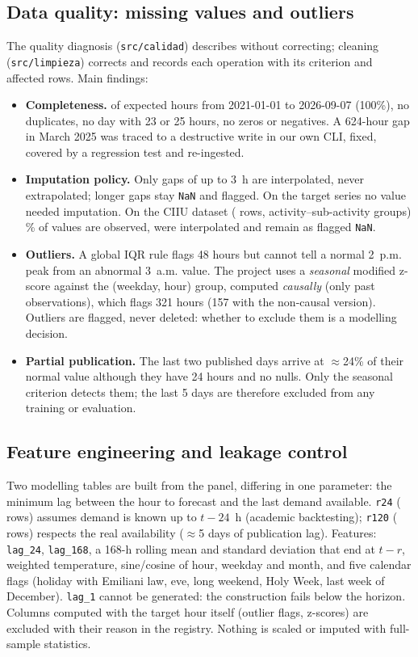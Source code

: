 \documentclass[conference,10pt]{IEEEtran}
\begin{document}
\subsection{Data quality: missing values and outliers}
The quality diagnosis (\texttt{src/calidad}) describes without correcting; cleaning (\texttt{src/limpieza}) corrects and records each operation with its criterion and affected rows. Main findings:
\begin{itemize}
\item \textbf{Completeness.} \panelFilas{} of \panelFilas{} expected hours from 2021-01-01 to 2026-09-07 (100\%), no duplicates, no day with 23 or 25 hours, no zeros or negatives. A 624-hour gap in March 2025 was traced to a destructive write in our own CLI, fixed, covered by a regression test and re-ingested.
\item \textbf{Imputation policy.} Only gaps of up to 3~h are interpolated, never extrapolated; longer gaps stay \texttt{NaN} and flagged. On the target series no value needed imputation. On the CIIU dataset (\ciiuFilas{} rows, \ciiuGrupos{} activity--sub-activity groups) \ciiuObservadoPct\% of values are observed, \ciiuInterpolados{} were interpolated and \ciiuFaltantes{} remain as flagged \texttt{NaN}.
\item \textbf{Outliers.} A global IQR rule flags 48 hours but cannot tell a normal 2~p.m. peak from an abnormal 3~a.m. value. The project uses a \emph{seasonal} modified z-score against the (weekday, hour) group, computed \emph{causally} (only past observations), which flags 321 hours (157 with the non-causal version). Outliers are flagged, never deleted: whether to exclude them is a modelling decision.
\item \textbf{Partial publication.} The last two published days arrive at $\approx$24\% of their normal value although they have 24 hours and no nulls. Only the seasonal criterion detects them; the last 5 days are therefore excluded from any training or evaluation.
\end{itemize}

\subsection{Feature engineering and leakage control}
Two modelling tables are built from the panel, differing in one parameter: the minimum lag between the hour to forecast and the last demand available. \texttt{r24} (\rVeinticuatroFilas{} rows) assumes demand is known up to $t-24$~h (academic backtesting); \texttt{r120} (\rCientoVeinteFilas{} rows) respects the real availability ($\approx$5 days of publication lag). Features: \texttt{lag\_24}, \texttt{lag\_168}, a 168-h rolling mean and standard deviation that end at $t-r$, weighted temperature, sine/cosine of hour, weekday and month, and five calendar flags (holiday with Emiliani law, eve, long weekend, Holy Week, last week of December). \texttt{lag\_1} cannot be generated: the construction fails below the horizon. Columns computed with the target hour itself (outlier flags, z-scores) are excluded with their reason in the registry. Nothing is scaled or imputed with full-sample statistics.
\end{document}
